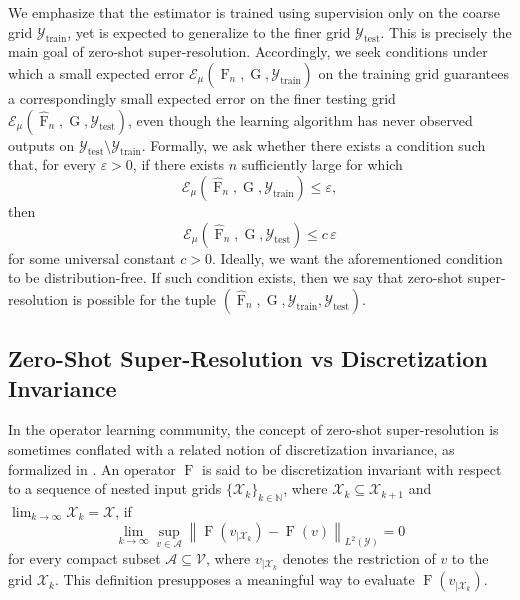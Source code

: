 \documentclass[11pt]{article}
\theoremstyle{plain}
\newcommand{\Acal}{\mathcal{A}}
\newcommand{\Xcal}{\mathcal{X}}
\newcommand{\Ycal}{\mathcal{Y}}
\newcommand{\Vcal}{\mathcal{V}}
\begin{document}
We emphasize that the estimator is trained using supervision only on the coarse grid
$\Ycal_{\mathrm{train}}$, yet is expected to generalize to the finer grid
$\Ycal_{\mathrm{test}}$. This is precisely the main goal of zero-shot super-resolution. Accordingly, we seek conditions under which a small expected error
$\mathcal{E}_{\mu}(\widehat{\operatorname{F}}_n, \operatorname{G}, \Ycal_{\mathrm{train}})$ on the
training grid guarantees a correspondingly small expected error on the finer testing grid
$\mathcal{E}_{\mu}(\widehat{\operatorname{F}}_n, \operatorname{G}, \Ycal_{\mathrm{test}})$, even
though the learning algorithm has never observed outputs on
$\Ycal_{\mathrm{test}} \setminus \Ycal_{\mathrm{train}}$. Formally, we ask whether there exists a
condition such that, for every $\varepsilon > 0$, if there exists $n$ sufficiently large for which
\[
\mathcal{E}_{\mu}(\widehat{\operatorname{F}}_n, \operatorname{G}, \Ycal_{\mathrm{train}})
\le \varepsilon,
\]
then
\[
\mathcal{E}_{\mu}(\widehat{\operatorname{F}}_n, \operatorname{G}, \Ycal_{\mathrm{test}})
\le c\,\varepsilon
\]
for some universal constant $c > 0$. Ideally, we want the aforementioned condition to be distribution-free. If such condition exists, then we say that zero-shot super-resolution is possible for the tuple $(\widehat{\operatorname{F}}_n, \operatorname{G}, \Ycal_{\mathrm{train}}, \Ycal_{\mathrm{test}})$. 






\subsection{Zero-Shot Super-Resolution vs Discretization Invariance}\label{sec:zeroshot-vs-dis-inv}
In the operator learning community, the concept of zero-shot super-resolution is sometimes conflated with a related notion of discretization invariance, as formalized in \cite[Definition 4]{kovachki2023neural}. An operator $ \operatorname{F} $ is said to be discretization invariant with respect to a sequence of nested input grids $ \{\Xcal_k\}_{k \in \mathbb{N}} $, where $ \Xcal_k \subseteq \Xcal_{k+1} $ and $ \lim_{k \to \infty} \Xcal_k = \Xcal $, if
\[
\lim_{k \to \infty} \sup_{v \in \Acal} \left\| \operatorname{F}(v_{|\Xcal_k}) - \operatorname{F}(v) \right\|_{L^2(\Ycal)} = 0
\]
for every compact subset $ \Acal \subseteq \Vcal $, where $ v_{|\Xcal_k} $ denotes the restriction of $ v $ to the grid $ \Xcal_k $. This definition presupposes a meaningful way to evaluate $ \operatorname{F}(v_{|\Xcal_k}) $.
\end{document}
